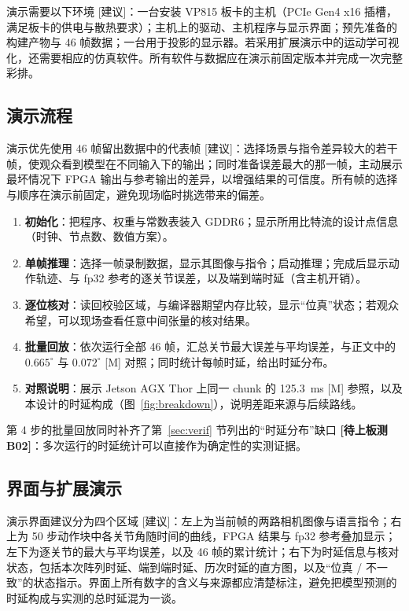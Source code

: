 \documentclass[a4paper,10.5pt]{ctexart}
\newcommand{\tM}{\textsf{[M]}}              %
\newcommand{\tR}{\textsf{[建议]}}           %
\newcommand{\tB}[1]{\textcolor{red!70!black}{\textsf{\textbf{[待上板测 #1]}}}}
\begin{document}
演示需要以下环境 \tR：一台安装 VP815 板卡的主机（PCIe Gen4 x16 插槽，满足板卡的供电与散热要求）；主机上的驱动、主机程序与显示界面；预先准备的构建产物与 46 帧数据；一台用于投影的显示器。若采用扩展演示中的运动学可视化，还需要相应的仿真软件。所有软件与数据应在演示前固定版本并完成一次完整彩排。

\subsection{演示流程}

演示优先使用 46 帧留出数据中的代表帧 \tR：选择场景与指令差异较大的若干帧，使观众看到模型在不同输入下的输出；同时准备误差最大的那一帧，主动展示最坏情况下 FPGA 输出与参考输出的差异，以增强结果的可信度。所有帧的选择与顺序在演示前固定，避免现场临时挑选带来的偏差。

\begin{enumerate}
  \item \textbf{初始化}：把程序、权重与常数表装入 GDDR6；显示所用比特流的设计点信息（时钟、节点数、数值方案）。
  \item \textbf{单帧推理}：选择一帧录制数据，显示其图像与指令；启动推理；完成后显示动作轨迹、与 fp32 参考的逐关节误差，以及端到端时延（含主机开销）。
  \item \textbf{逐位核对}：读回校验区域，与编译器期望内存比较，显示“位真”状态；若观众希望，可以现场查看任意中间张量的核对结果。
  \item \textbf{批量回放}：依次运行全部 46 帧，汇总关节最大误差与平均误差，与正文中的 $0.665^\circ$ 与 $0.072^\circ$ \tM{} 对照；同时统计每帧时延，给出时延分布。
  \item \textbf{对照说明}：展示 Jetson AGX Thor 上同一 chunk 的 125.3~ms \tM{} 参照，以及本设计的时延构成（图~\ref{fig:breakdown}），说明差距来源与后续路线。
\end{enumerate}

第 4 步的批量回放同时补齐了第~\ref{sec:verif} 节列出的“时延分布”缺口 \tB{B02}：多次运行的时延统计可以直接作为确定性的实测证据。

\subsection{界面与扩展演示}

演示界面建议分为四个区域 \tR：左上为当前帧的两路相机图像与语言指令；右上为 50 步动作块中各关节角随时间的曲线，FPGA 结果与 fp32 参考叠加显示；左下为逐关节的最大与平均误差，以及 46 帧的累计统计；右下为时延信息与核对状态，包括本次阵列时延、端到端时延、历次时延的直方图，以及“位真 / 不一致”的状态指示。界面上所有数字的含义与来源都应清楚标注，避免把模型预测的时延构成与实测的总时延混为一谈。
\end{document}
